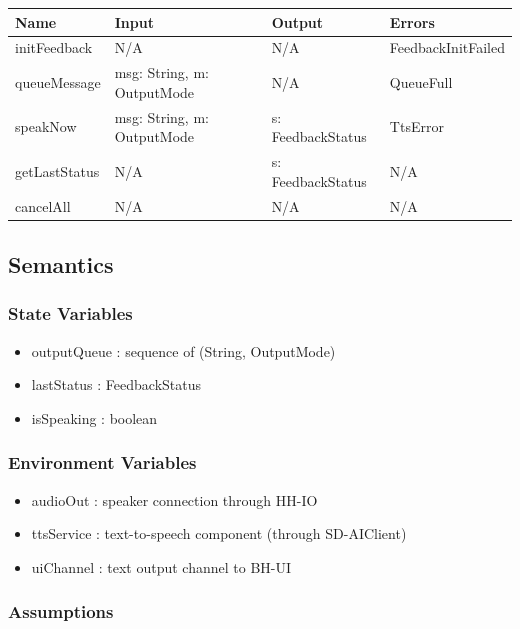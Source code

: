 \documentclass[12pt, titlepage]{article}
\begin{document}
\begin{center}
\begin{tabular}{p{2.7cm} p{4cm} p{4cm} p{2.5cm}}
\hline
\textbf{Name} & \textbf{Input} & \textbf{Output} & \textbf{Errors} \\
\hline
initFeedback & N/A & N/A & FeedbackInitFailed \\
queueMessage & msg: String, m: OutputMode & N/A & QueueFull \\
speakNow & msg: String, m: OutputMode & s: FeedbackStatus & TtsError \\
getLastStatus & N/A & s: FeedbackStatus & N/A \\
cancelAll & N/A & N/A & N/A \\
\hline
\end{tabular}
\end{center}

\subsection{Semantics}

\subsubsection{State Variables}

\begin{itemize}
  \item outputQueue : sequence of (String, OutputMode)
  \item lastStatus : FeedbackStatus
  \item isSpeaking : boolean
\end{itemize}

\subsubsection{Environment Variables}

\begin{itemize}
  \item audioOut : speaker connection through HH-IO
  \item ttsService : text-to-speech component (through SD-AIClient)
  \item uiChannel : text output channel to BH-UI
\end{itemize}

\subsubsection{Assumptions}
\end{document}
